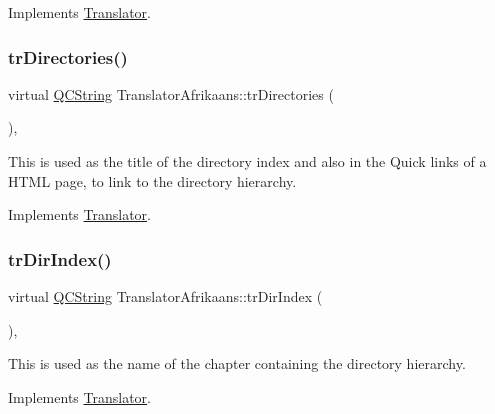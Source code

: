 Implements \mbox{\hyperlink{class_translator}{Translator}}.

\mbox{\label{class_translator_afrikaans_a91df977651e11aa72f3384a762d5bc7f}} 
\subsubsection{\texorpdfstring{trDirectories()}{trDirectories()}}
{\footnotesize\ttfamily virtual \mbox{\hyperlink{class_q_c_string}{Q\+C\+String}} Translator\+Afrikaans\+::tr\+Directories (\begin{DoxyParamCaption}{ }\end{DoxyParamCaption})\hspace{0.3cm}{\ttfamily [inline]}, {\ttfamily [virtual]}}

This is used as the title of the directory index and also in the Quick links of a H\+T\+ML page, to link to the directory hierarchy. 

Implements \mbox{\hyperlink{class_translator}{Translator}}.

\mbox{\label{class_translator_afrikaans_ae088607ec2d47cfe0f9b4658a82ff141}} 
\subsubsection{\texorpdfstring{trDirIndex()}{trDirIndex()}}
{\footnotesize\ttfamily virtual \mbox{\hyperlink{class_q_c_string}{Q\+C\+String}} Translator\+Afrikaans\+::tr\+Dir\+Index (\begin{DoxyParamCaption}{ }\end{DoxyParamCaption})\hspace{0.3cm}{\ttfamily [inline]}, {\ttfamily [virtual]}}

This is used as the name of the chapter containing the directory hierarchy. 

Implements \mbox{\hyperlink{class_translator}{Translator}}.

\mbox{\label{class_translator_afrikaans_af9a86479385cf5aee5e3b1910eb43789}} 
